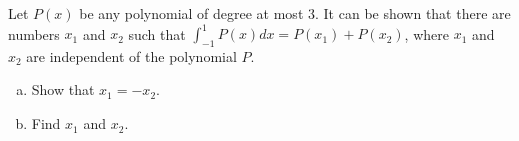 Let $P(x)$ be any polynomial of degree at most $3$. It can be shown that there
are numbers $x_1$ and $x_2$ such that $\displaystyle{\int_{-1}^{1} P(x) dx =
P(x_1) + P(x_2)}$, where $x_1$ and $x_2$ are independent of the polynomial $P$.

\begin{enumerate}[(a)]

\item Show that $x_1 = - x_2$.
\item Find $x_1$ and $x_2$.

\end{enumerate}
